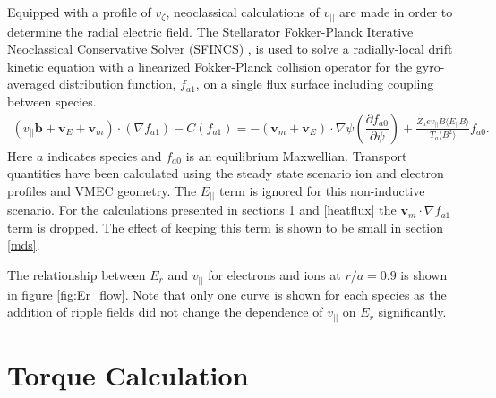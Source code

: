 \documentclass{article}
\newcommand{\partder}[2]{\dfrac{\partial  #1}{\partial  #2}} %
\begin{document}
Equipped with a profile of $v_{\zeta}$, neoclassical calculations of $v_{||}$ are made in order to determine the radial electric field. The Stellarator Fokker-Planck Iterative Neoclassical Conservative Solver (SFINCS) \cite{Landreman2014}, is used to solve a radially-local drift kinetic equation with a linearized Fokker-Planck collision operator for the gyro-averaged distribution function, $f_{a1}$, on a single flux surface including coupling between species. 
\begin{gather}
( v_{||} \bm{b} + \bm{v}_E + \bm{v}_m) \cdot (\nabla f_{a1})  - C(f_{a1}) = - (\bm{v}_{m} + \bm{v}_E) \cdot \nabla \psi \left( \partder{f_{a0}}{\psi} \right) + \frac{Z_a e v_{||} B \langle E_{||} B \rangle}{T_a \langle B^2 \rangle } f_{a0}.
\end{gather} \label{kineticequation}
\hspace{-1mm}Here $a$ indicates species and $f_{a0}$ is an equilibrium Maxwellian. Transport quantities have been calculated using the steady state scenario ion and electron profiles and VMEC geometry. The $E_{||}$ term is ignored for this non-inductive scenario. For the calculations presented in sections \ref{torque} and \ref{heatflux} the $\bm{v}_m \cdot \nabla f_{a1}$ term is dropped. The effect of keeping this term is shown to be small in section \ref{mds}.

The relationship between $E_r$ and $v_{||}$ for electrons and ions at $r/a = 0.9$ is shown in figure \ref{fig:Er_flow}. Note that only one curve is shown for each species as the addition of ripple fields did not change the dependence of $v_{||}$ on $E_r$ significantly.  %

\FloatBarrier

\section{Torque Calculation}\label{torque}
\end{document}
